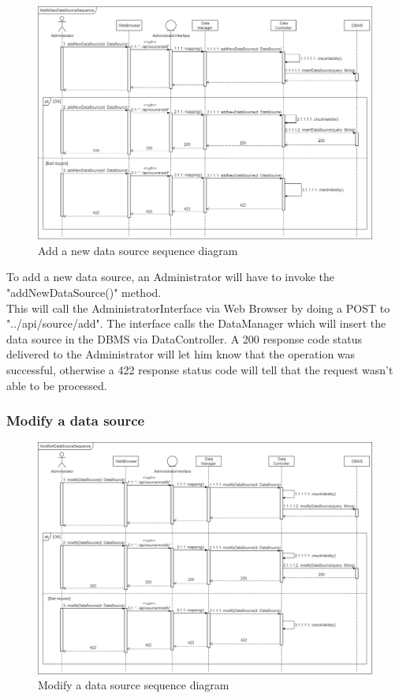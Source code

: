 \begin{figure}[h!]
        \centering
        \includegraphics[scale=0.27]{images/runtime_view/add_new_data_source_runtime_view_diagram.png}
        \caption{Add a new data source sequence diagram}
        \label{fig:add_new_data_source_sequence_diagram}
\end{figure}
\FloatBarrier

To add a new data source, an Administrator will have to invoke the "addNewDataSource()" method.\\
This will call the AdministratorInterface via Web Browser by doing a POST to "../api/source/add". The interface calls the DataManager which will insert the data source in the DBMS via DataController. 
A 200 response code status delivered to the Administrator will let him know that the operation was successful, otherwise a 422 response status code will tell that the request wasn't able to be processed.

\newpage
\subsubsection{Modify a data source}

\begin{figure}[h!]
        \centering
        \includegraphics[scale=0.27]{images/runtime_view/modify_data_source_runtime_view_diagram.png}
        \caption{Modify a data source sequence diagram}
        \label{fig:modify_data_source_sequence_diagram}
\end{figure}
\FloatBarrier

